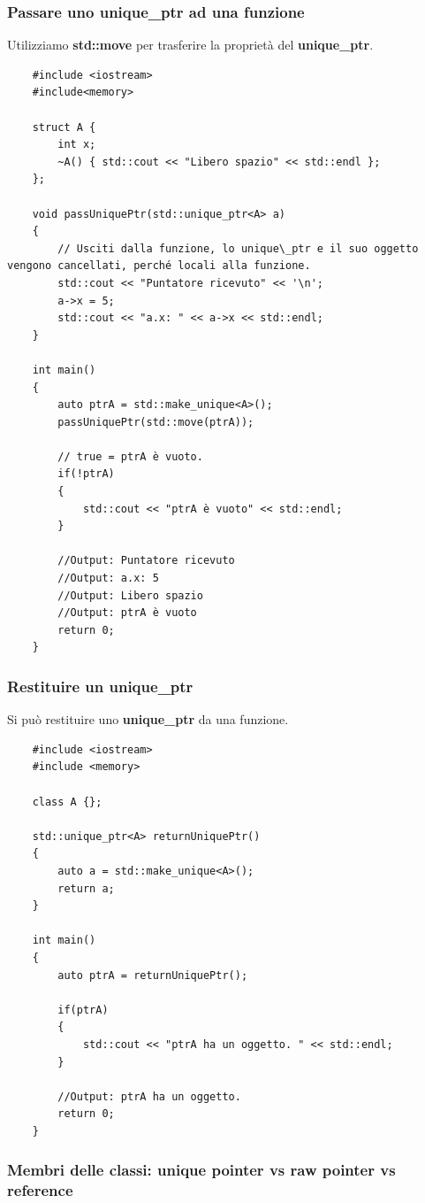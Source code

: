 \subsubsection{Passare uno unique\_ptr ad una funzione}

\textsf{\small Utilizziamo \textbf{std::move} per trasferire la proprietà del \textbf{unique\_ptr}.} \\

\begin{lstlisting}
	#include <iostream>
	#include<memory>
	
	struct A {
		int x;
		~A() { std::cout << "Libero spazio" << std::endl };
	};

	void passUniquePtr(std::unique_ptr<A> a)
	{
		// Usciti dalla funzione, lo unique\_ptr e il suo oggetto vengono cancellati, perché locali alla funzione.
		std::cout << "Puntatore ricevuto" << '\n';
		a->x = 5;
		std::cout << "a.x: " << a->x << std::endl;
	}

	int main()
	{
		auto ptrA = std::make_unique<A>();
		passUniquePtr(std::move(ptrA));
		
		// true = ptrA è vuoto.
		if(!ptrA)
		{
			std::cout << "ptrA è vuoto" << std::endl;
		}
	
		//Output: Puntatore ricevuto
		//Output: a.x: 5
		//Output: Libero spazio
		//Output: ptrA è vuoto
		return 0;
	}
\end{lstlisting} 

\subsubsection{Restituire un unique\_ptr}

\textsf{\small Si può restituire uno \textbf{unique\_ptr} da una funzione. } \\

\begin{lstlisting}
	#include <iostream>
	#include <memory>
	
	class A {};
	
	std::unique_ptr<A> returnUniquePtr()
	{
		auto a = std::make_unique<A>();
		return a;
	}

	int main()
	{
		auto ptrA = returnUniquePtr();
		
		if(ptrA)
		{
			std::cout << "ptrA ha un oggetto. " << std::endl;	
		}
	
		//Output: ptrA ha un oggetto.
		return 0;
	}
\end{lstlisting}

\subsubsection{Membri delle classi: unique pointer vs raw pointer vs reference}

